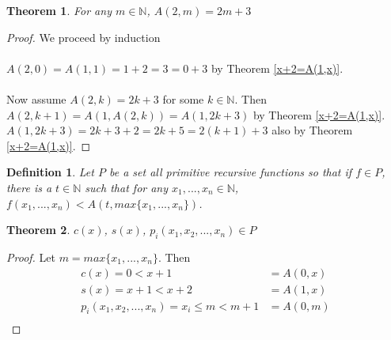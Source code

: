 \documentclass[12pt, letterpaper]{article}
\newtheorem{theorem}{Theorem}
\newtheorem*{definition}{Definition}
\theoremstyle{case}
\begin{document}
    \begin{theorem}
      \label{a(2,m)=2m+3}
      For any $m \in \mathbb{N}$, $A(2, m) = 2m + 3$
    \end{theorem}
    \begin{proof}
      We proceed by induction
      \\
      \\
      $A(2, 0) = A(1, 1) = 1 + 2 = 3 = 0 + 3$ by Theorem \ref{x+2=A(1,x)}.
      \\
      \\
      Now assume $A(2, k) = 2k + 3$ for some $k \in \mathbb{N}$.
      Then $A(2, k + 1) = A(1, A(2, k)) = A(1, 2k + 3)$ by Theorem \ref{x+2=A(1,x)}.
      $A(1, 2k + 3) = 2k + 3 + 2 = 2k + 5 = 2(k + 1) + 3$ also by Theorem \ref{x+2=A(1,x)}.
    \end{proof}
    
    \begin{definition}
      Let $P$ be a set all primitive recursive functions so that if $f \in P$, there is a $t \in \mathbb{N}$
      such that for any $x_1, ..., x_n \in \mathbb{N}$, $f(x_1, ..., x_n) < A(t, max\{x_1, ..., x_n\})$.
    \end{definition}

    \begin{theorem}
      $c(x)$, $s(x)$, $p_i(x_1, x_2, ..., x_n) \in P$
    \end{theorem}
    \begin{proof}
      Let $m = max\{x_1, ..., x_n\}$.
      Then
      \begin{equation*}
        \begin{aligned}
          c(x) = 0 < x + 1 &= A(0, x) \\
          s(x) = x + 1 < x + 2 &= A(1, x) \\
          p_i(x_1, x_2, ..., x_n) = x_i \leq m < m + 1 &= A(0, m) \\
        \end{aligned}
      \end{equation*}
    \end{proof}
\end{document}
